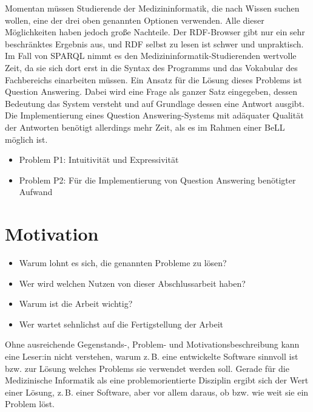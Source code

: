 Momentan müssen Studierende der Medizininformatik, die nach Wissen suchen wollen, eine der drei oben genannten Optionen verwenden.
Alle dieser Möglichkeiten haben jedoch große Nachteile. Der RDF-Browser gibt nur ein sehr beschränktes Ergebnis aus, und RDF selbst zu lesen ist schwer und unpraktisch.
Im Fall von SPARQL nimmt es den Medizininformatik-Studierenden wertvolle Zeit, da sie sich dort erst in die Syntax des Programms und das Vokabular des Fachbereichs einarbeiten müssen.
Ein Ansatz für die Lösung dieses Problems ist Question Answering.
Dabei wird eine Frage als ganzer Satz eingegeben, dessen Bedeutung das System versteht und auf Grundlage dessen eine Antwort ausgibt.
Die Implementierung eines Question Answering-Systems mit adäquater Qualität der Antworten benötigt allerdings mehr Zeit, als es im Rahmen einer BeLL möglich ist.

\begin{itemize}
\item Problem P1: Intuitivität und Expressivität
\item Problem P2: Für die Implementierung von Question Answering benötigter Aufwand
\end{itemize}


\section{Motivation}

\begin{itemize}
\item Warum lohnt es sich, die genannten Probleme zu lösen?
\item Wer wird welchen Nutzen von dieser Abschlussarbeit haben?
\item Warum ist die Arbeit wichtig?
\item Wer wartet sehnlichst auf die Fertigstellung der Arbeit
\end{itemize}
Ohne ausreichende Gegenstands-, Problem- und Motivationsbeschreibung kann eine Leser:in nicht verstehen, warum z.\,B. eine entwickelte Software sinnvoll ist bzw. zur Lösung welches Problems sie verwendet werden soll.
Gerade für die Medizinische Informatik als eine problemorientierte Disziplin ergibt sich der Wert einer Lösung, z.\,B. einer Software, aber vor allem daraus, ob bzw. wie weit sie ein Problem löst.

